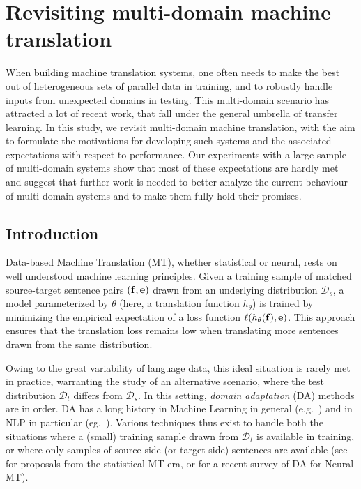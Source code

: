 \chapter{Revisiting multi-domain machine translation}
  When building machine translation systems, one often needs to make the best out of heterogeneous sets of parallel data in training, and to robustly handle inputs from unexpected domains in testing. This multi-domain scenario has attracted a lot of recent work, that fall under the general umbrella of transfer learning.
In this study, we revisit multi-domain machine translation, with the aim to formulate the motivations for developing such systems and the associated expectations with respect to performance. Our experiments with a large sample of multi-domain systems show that most of these expectations are hardly met and suggest that further work is needed to better analyze the current behaviour of multi-domain systems and to make them fully hold their promises.

\section{Introduction} \label{sec:intro}
Data-based Machine Translation (MT), whether statistical or neural, rests on well understood machine learning principles. Given a training sample of matched source-target sentence pairs $(\mathbf{f},\mathbf{e})$ drawn from an underlying distribution $\mathcal{D}_s$, a model parameterized by $\theta$ (here, a translation function $h_{\theta}$) is trained by minimizing the empirical expectation of a loss function $\ell(h_\theta(\mathbf{f}), \mathbf{e})$. This approach ensures that the translation loss remains low when translating more sentences drawn from the same distribution.

Owing to the great variability of language data, this ideal situation is rarely met in practice, warranting the study of an alternative scenario, where the test distribution $\mathcal{D}_t$ differs from $\mathcal{D}_s$. In this setting, \emph{domain adaptation} (DA) methods are in order. DA has a long history in Machine Learning in general (e.g.\ \cite{Shimodaira00improving,Ben10A,Quinonero08dataset,Pan10asurvey}) and in NLP in particular (eg.\ \cite{Daume06domain,Blitzer07domain,Jiang07instance}). Various techniques thus exist to handle both the situations where a (small) training sample drawn from $\mathcal{D}_t$ is available in training, or where only samples of source-side (or target-side) sentences are available (see \cite{Foster07mixture,Bertoldi09domain,Axelrod11domain} for proposals from the statistical MT era, or \cite{Chu18asurvey} for a recent survey of DA for Neural MT).

